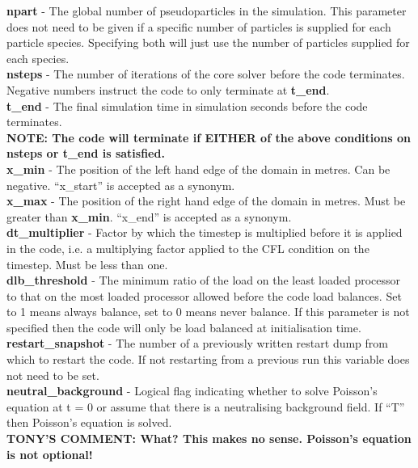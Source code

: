 \documentclass[12pt,a4paper]{article}
\newcommand{\emphtext}{\color{warwickdark} \fontfamily{phv}\selectfont\large\bf}
\newcommand{\inlineemph}[1]{{\color{warwicklight} \bf{#1}}}
\newcommand{\tony}[1]{{\color{warwickred} \bf{TONY'S COMMENT:} \bf{#1}}\\}
\begin{document}
{\emphtext npart} - The global number of pseudoparticles in the
simulation. This parameter does not need to be given if a specific number
of particles is supplied for each particle species. Specifying both will just
use the number of particles supplied for each species.\\

{\emphtext nsteps} - The number of iterations of the core solver before the
code terminates. Negative numbers instruct the code to only terminate at
\inlineemph{t\_end}.\\

{\emphtext t\_end} - The final simulation time in simulation seconds before the
code terminates.\\

{\emphtext NOTE: The code will terminate if EITHER of the above conditions on
nsteps or t\_end is satisfied.}\\

{\emphtext x\_min} - The position of the left hand edge of the domain in
metres. Can be negative. ``x\_start'' is accepted as a synonym.\\

{\emphtext x\_max} - The position of the right hand edge of the domain in
metres. Must be greater than \inlineemph{x\_min}.
``x\_end'' is accepted as a synonym.\\

{\emphtext dt\_multiplier} - Factor by which the timestep is multiplied before
it is applied in the code, i.e. a multiplying factor applied to the CFL
condition on the timestep. Must be less than one.\\

{\emphtext dlb\_threshold} - The minimum ratio of the
load on the least loaded processor to that on the most loaded processor allowed
before the code load balances. Set to 1 means
always balance, set to 0 means never balance. If this parameter is not
specified then the code will only be load balanced at initialisation time.\\

{\emphtext restart\_snapshot} - The number of a previously written restart
dump from which to restart the code. If not restarting from a previous run
this variable does not need to be set.\\

{\emphtext neutral\_background} - Logical flag indicating whether to
solve Poisson's equation at t = 0 or assume that there is a neutralising
background field. If ``T'' then Poisson's equation is solved.\\
\tony{What? This makes no sense. Poisson's equation is not optional!}
\end{document}
